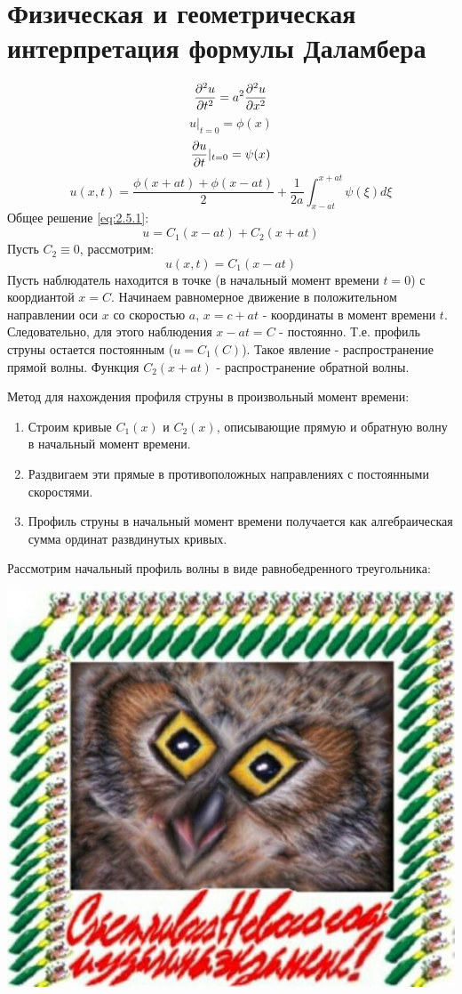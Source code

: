 \documentclass[../main.tex]{subfiles}
\begin{document}
\section{Физическая и геометрическая интерпретация формулы Даламбера}
\begin{equation}
	\label{eq:2.5.1}
	\frac{\partial ^2u}{\partial t^2}=a^2\frac{\partial ^2u}{\partial x^2}
\end{equation}
\begin{equation}
	u|_{t=0} = \phi(x)
\end{equation}
\begin{equation}
	\frac{\partial u}{\partial t}|_{t=0} = \psi(x)
\end{equation}
\begin{equation}
	u(x, t) = \frac{\phi(x + at) + \phi(x - at)}{2} + \frac{1}{2a}\int_{x-at}^{x+at}\psi(\xi)d\xi
\end{equation}
Общее решение \eqref{eq:2.5.1}:
$$
	u = C_1(x-at) + C_2(x+at)
$$
Пусть $C_2 \equiv 0$, рассмотрим:
$$
	u(x, t) = C_1(x - at)
$$
Пусть наблюдатель находится в точке (в начальный момент времени $t = 0$) с коордиантой $x = C$. Начинаем равномерное движение в положительном направлении оси $x$ со скоростью $a$,
$ x = c + at$ - координаты в момент времени $t$. Следовательно, для этого наблюдения $x - at = C$ - постоянно. Т.е. профиль струны остается постоянным ($u = C_1(C)$).
Такое явление - распространение прямой волны. Функция $C_2(x + at)$ - распространение обратной волны.

Метод для нахождения профиля струны в произвольный момент времени:
\begin{enumerate}
	\item Строим кривые $C_1(x)$ и $C_2(x)$, описывающие прямую и обратную волну в начальный момент времени.
	\item Раздвигаем эти прямые в противоположных направлениях с постоянными скоростями.
	\item Профиль струны в начальный момент времени получается как алгебраическая сумма ординат развдинутых кривых.
\end{enumerate}
Рассмотрим начальный профиль волны в виде равнобедренного треугольника:

\includegraphics[scale=0.5]{example.jpg}
\end{document}
